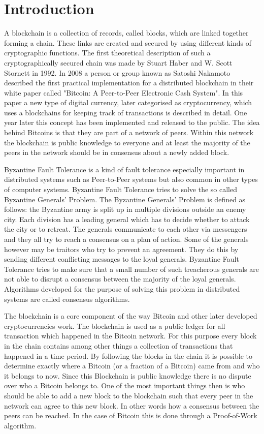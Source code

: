 \section{Introduction}

A blockchain is a collection of records, called blocks, which are linked together forming a chain. These links are created and secured by using different kinds of cryptographic functions.
The first theoretical description of such a cryptographically secured chain was made by Stuart Haber and W. Scott Stornett in 1992.\cite{book:haber} In 2008 a person or group known as Satoshi Nakamoto
described the first practical implementation for a distributed blockchain in their white paper called "Bitcoin: A Peer-to-Peer Electronic Cash System".\cite{url:bitcoin} In this paper a new type of digital
currency, later categorised as cryptocurrency, which uses a blockchains for keeping track of transactions is described in detail. One year later this concept has been implemented and released to the
public. The idea behind Bitcoins is that they are part of a network of peers. Within this network the blockchain is public knowledge to everyone and at least the majority of the peers in the
network should be in consensus about a newly added block.

Byzantine Fault Tolerance is a kind of fault tolerance especially important in distributed systems such as Peer-to-Peer systems but also common in other types of computer systems.
Byzantine Fault Tolerance tries to solve the so called Byzantine Generals' Problem. The Byzantine Generals' Problem is defined as follows: the Byzantine army is split up in multiple divisions 
outside an enemy city. Each division has a leading general which has to decide whether to attack the city or to retreat. The generals communicate to each other via messengers and they all try to
reach a consensus on a plan of action. Some of the generals however may be traitors who try to prevent an agreement. They do this by sending different conflicting messages to the loyal generals. 
Byzantine Fault Tolerance tries to make sure that a small number of such treacherous generals are not able to disrupt a consensus between the majority of the loyal generals.\cite{url:byzantine_general}
Algorithms developed for the purpose of solving this problem in distributed systems are called consensus algorithms.

The blockchain is a core component of the way Bitcoin and other later developed cryptocurrencies work. The blockchain is used as a public ledger for all transaction which happened in the Bitcoin
network. For this purpose every block in the chain contains among other things a collection of transactions that happened in a time period. By following the blocks in the chain it is possible to
determine exactly where a Bitcoin (or a fraction of a Bitcoin) came from and who it belongs to now. Since this Blockchain is public knowledge there is no dispute over who a Bitcoin belongs to.
One of the most important things then is who should be able to add a new block to the blockchain such that every peer in the network can agree to this new block. In other words how a consensus between
the peers can be reached. In the case of Bitcoin this is done through a Proof-of-Work algorithm.
